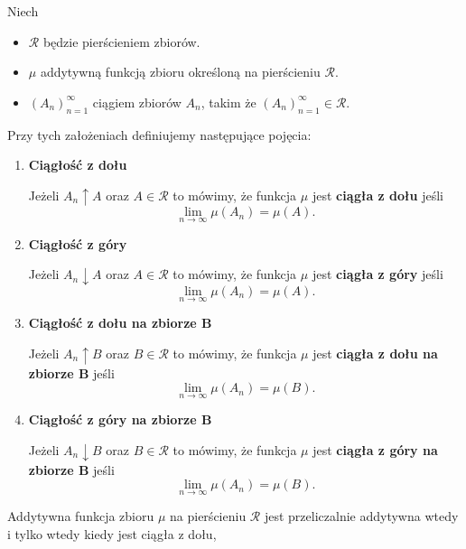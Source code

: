 \begin{definition}
	Niech
	\begin{itemize}
		\item $\mathcal{R}$ będzie pierścieniem zbiorów.
		\item $\mu$ addytywną funkcją zbioru określoną na pierścieniu $\mathcal{R}$.
		\item $\left( A_{n} \right)_{n=1}^{\infty}$ ciągiem zbiorów $A_{n}$, takim że $\left( A_{n} \right)_{n=1}^{\infty}\in \mathcal{R}$.
	\end{itemize}
	Przy tych założeniach definiujemy następujące pojęcia:
        \begin{enumerate}[label=\arabic*.]
		\item \textbf{Ciągłość z dołu}

			Jeżeli $A_{n}\uparrow A$ oraz $A\in \mathcal{R}$ to mówimy, że funkcja $\mu$ jest \textbf{ciągła z dołu} jeśli
			\[
			\lim_{n \to \infty}\mu\left( A_{n} \right) = \mu\left( A \right) 
			.\] 
		\item \textbf{Ciągłość z góry} 

			Jeżeli $A_{n}\downarrow A$ oraz $A\in \mathcal{R}$ to mówimy, że funkcja $\mu$ jest \textbf{ciągła z góry} jeśli
			\[
			\lim_{n \to \infty}\mu\left( A_{n} \right) = \mu\left( A \right) 
			.\] 
		\item \textbf{Ciągłość z dołu na zbiorze B} 

			Jeżeli $A_{n}\uparrow B$ oraz $B\in \mathcal{R}$ to mówimy, że funkcja $\mu$ jest \textbf{ciągła z dołu na zbiorze B} jeśli
			\[
			\lim_{n \to \infty}\mu\left( A_{n} \right) = \mu\left( B \right) 
			.\] 
		\item \textbf{Ciągłość z góry na zbiorze B} 

			Jeżeli $A_{n}\downarrow B$ oraz $B\in \mathcal{R}$ to mówimy, że funkcja $\mu$ jest \textbf{ciągła z góry na zbiorze B} jeśli
			\[
			\lim_{n \to \infty}\mu\left( A_{n} \right) = \mu\left( B \right) 
			.\] 
        \end{enumerate}

\end{definition} 
\begin{theorem}
	Addytywna funkcja zbioru $\mu $ na pierścieniu $\mathcal{R}$ jest przeliczalnie addytywna wtedy i tylko wtedy kiedy jest ciągła z dołu,
\end{theorem} 
